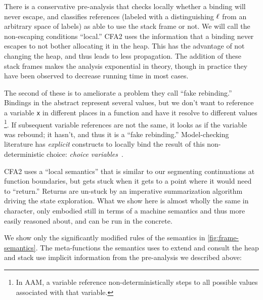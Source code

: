 %
There is a conservative pre-analysis that checks locally whether a binding will never escape, and classifies references (labeled with a distinguishing $\ell$ from an arbitrary space of labels) as able to use the stack frame or not.
%
We will call the non-escaping conditions ``local.''
%
%
CFA2 uses the information that a binding never escapes to not bother allocating it in the heap.
%
This has the advantage of not changing the heap, and thus leads to less propagation.
%
The addition of these stack frames makes the analysis exponential in theory, though in practice they have been observed to decrease running time in most cases.

The second of these is to ameliorate a problem they call ``fake rebinding.''
%
Bindings in the abstract represent several values, but we don't want to reference a variable \texttt{x} in different places in a function and have it resolve to different values
\footnote{In AAM, a variable reference non-deterministically steps to all possible values associated with that variable.}.
%
If subsequent variable references are not the same, it looks as if the variable was rebound; it hasn't, and thus it is a ``fake rebinding.''
%
Model-checking literature has \emph{explicit} constructs to locally bind the result of this non-deterministic choice: \emph{choice variables}~\citep{ianjohnson:DBLP:conf/spin/CookKS05, ianjohnson:DBLP:journals/cacm/DilligDA10}.
%
%

CFA2 uses a ``local semantics'' that is similar to our segmenting continuations at function boundaries, but gets stuck when it gets to a point where it would need to ``return.''
%
Returns are un-stuck by an imperative summarization algorithm driving the state exploration.
%
What we show here is almost wholly the same in character, only embodied still in terms of a machine semantics and thus more easily reasoned about, and can be run in the concrete.

We show only the significantly modified rules of the semantics in \autoref{fig:frame-semantics}.
%
%
The meta-functions the semantics uses to extend and consult the heap and stack use implicit information from the pre-analysis we described above:


